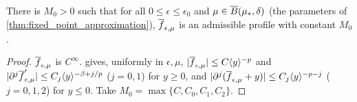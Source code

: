 \begin{lemma}
  \label{lem:c10_approx_admissible}
  There is $M_0>0$ such that for all $0\le\epsilon\le\epsilon_0$ and $\mu\in\overline{B}(\mu_*,\delta)$ (the
  parameters of \cref{thm:fixed_point_approximation}), $\overline{f}_{\epsilon,\mu}$ is an admissible profile
  with constant $M_0$.
\end{lemma}
\begin{proof}
  $\overline{f}_{\epsilon,\mu}$ is $C^\infty$.  gives, uniformly in $\epsilon,\mu$,
  $|\overline{f}_{\epsilon,\mu}|\le C\langle y \rangle^{-p}$ and $|\partial^j\overline{f}'_{\epsilon,\mu}|\le C_j\langle y \rangle^{-\beta+j/p}$
  ($j=0,1$) for $y\ge0$, and $|\partial^j(\overline{f}_{\epsilon,\mu}+y)|\le C_j\langle y \rangle^{-p-j}$ ($j=0,1,2$) for $y\le0$.
  Take $M_0=\max\{C,C_0,C_1,C_2\}$.
\end{proof}

